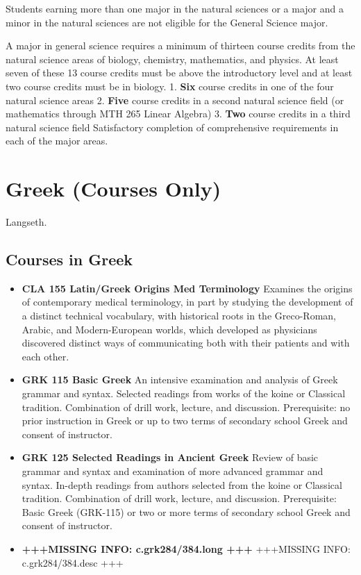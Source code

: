 \documentclass[
  letterpaper,
]{scrbook}
\providecommand{\tightlist}{%
  \setlength{\itemsep}{0pt}\setlength{\parskip}{0pt}}
\begin{document}
Students earning more than one major in the natural sciences or a major
and a minor in the natural sciences are not eligible for the General
Science major.

A major in general science requires a minimum of thirteen course credits
from the natural science areas of biology, chemistry, mathematics, and
physics. At least seven of these 13 course credits must be above the
introductory level and at least two course credits must be in biology.
1. \textbf{Six} course credits in one of the four natural science areas
2. \textbf{Five} course credits in a second natural science field (or
mathematics through MTH 265 Linear Algebra) 3. \textbf{Two} course
credits in a third natural science field Satisfactory completion of
comprehensive requirements in each of the major areas.

\hypertarget{sec-greek}{%
\section{Greek (Courses Only)}\label{sec-greek}}

Langseth.

\hypertarget{courses-in-greek}{%
\subsection{Courses in Greek}\label{courses-in-greek}}

\begin{itemize}
\tightlist
\item
  \textbf{CLA 155 Latin/Greek Origins Med Terminology} Examines the
  origins of contemporary medical terminology, in part by studying the
  development of a distinct technical vocabulary, with historical roots
  in the Greco-Roman, Arabic, and Modern-European worlds, which
  developed as physicians discovered distinct ways of communicating both
  with their patients and with each other.
\item
  \textbf{GRK 115 Basic Greek} An intensive examination and analysis of
  Greek grammar and syntax. Selected readings from works of the koine or
  Classical tradition. Combination of drill work, lecture, and
  discussion. Prerequisite: no prior instruction in Greek or up to two
  terms of secondary school Greek and consent of instructor.
\item
  \textbf{GRK 125 Selected Readings in Ancient Greek} Review of basic
  grammar and syntax and examination of more advanced grammar and
  syntax. In-depth readings from authors selected from the koine or
  Classical tradition. Combination of drill work, lecture, and
  discussion. Prerequisite: Basic Greek (GRK-115) or two or more terms
  of secondary school Greek and consent of instructor.
\item
  \textbf{+++MISSING INFO: c.grk284/384.long +++} +++MISSING INFO:
  c.grk284/384.desc +++
\end{itemize}
\end{document}
